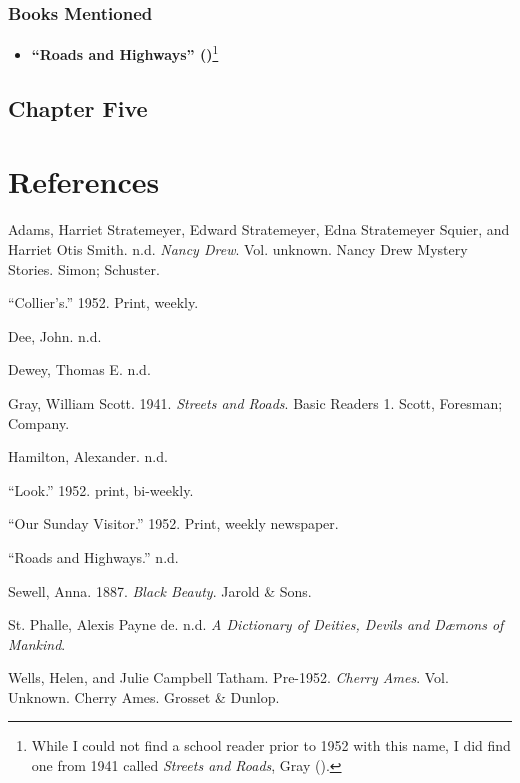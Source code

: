 \documentclass[
  11pt,
]{article}
\providecommand{\tightlist}{%
  \setlength{\itemsep}{0pt}\setlength{\parskip}{0pt}}
\newlength{\cslhangindent}
\newenvironment{CSLReferences}[2] %
 {\begin{list}{}{%
  \setlength{\itemindent}{0pt}
  \setlength{\leftmargin}{0pt}
  \setlength{\parsep}{0pt}
  \ifodd #1
   \setlength{\leftmargin}{\cslhangindent}
   \setlength{\itemindent}{-1\cslhangindent}
  \fi
  \setlength{\itemsep}{#2\baselineskip}}}
 {\end{list}}
\begin{document}
\subsubsection{Books Mentioned}\label{books-mentioned-2}

\begin{itemize}
\tightlist
\item
  \textbf{{``Roads and Highways''}
  ()}\footnote{While I could not find a
    school reader prior to 1952 with this name, I did find one from 1941
    called \emph{Streets and Roads}, Gray
    ().}
\end{itemize}

\subsection{Chapter Five}\label{chapter-five}

\section{References}\label{references}

\label{refs}
\begin{CSLReferences}{1}{0}
Adams, Harriet Stratemeyer, Edward Stratemeyer, Edna Stratemeyer Squier,
and Harriet Otis Smith. n.d. \emph{Nancy Drew}. Vol. unknown. Nancy Drew
Mystery Stories. Simon; Schuster.

{``Collier's.''} 1952. Print, weekly.

Dee, John. n.d.

Dewey, Thomas E. n.d.

Gray, William Scott. 1941. \emph{Streets and Roads}. Basic Readers 1.
Scott, Foresman; Company.

Hamilton, Alexander. n.d.

{``Look.''} 1952. print, bi-weekly.

{``Our Sunday Visitor.''} 1952. Print, weekly newspaper.

{``Roads and Highways.''} n.d.

Sewell, Anna. 1887. \emph{Black Beauty}. Jarold \& Sons.

St. Phalle, Alexis Payne de. n.d. \emph{A Dictionary of Deities, Devils
and Dæmons of Mankind}.

Wells, Helen, and Julie Campbell Tatham. Pre-1952. \emph{Cherry Ames}.
Vol. Unknown. Cherry Ames. Grosset \& Dunlop.

\end{CSLReferences}
\end{document}
